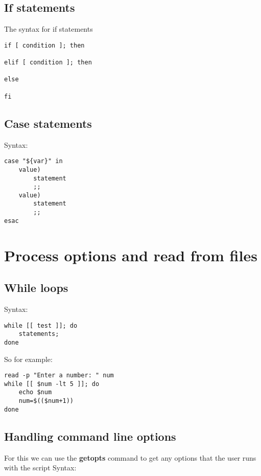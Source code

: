\documentclass{report}
\begin{document}
    \bigbreak \noindent 
    \subsection{If statements}
    The syntax for if statements
    \bigbreak \noindent 
    
    \begin{verbatim}
if [ condition ]; then 

elif [ condition ]; then

else 

fi
    \end{verbatim}
    \bigbreak \noindent
    

    \pagebreak \bigbreak \noindent 
    \subsection{Case statements}
    \bigbreak \noindent 
    Syntax:
    
    \begin{verbatim}
case "${var}" in 
    value)
        statement
        ;;
    value)
        statement
        ;;
esac
    \end{verbatim}
    \bigbreak \noindent
    
    \bigbreak \noindent 

    \pagebreak \bigbreak \noindent 
    \section{\LARGE Process options and read from files}
    \bigbreak \noindent 
    \subsection{While loops}
    \bigbreak \noindent 
    Syntax:
    
    \begin{verbatim}
while [[ test ]]; do
    statements;
done
    \end{verbatim}
    \bigbreak \noindent
    
    \bigbreak \noindent 
    So for example:
    
    \begin{verbatim}
read -p "Enter a number: " num
while [[ $num -lt 5 ]]; do
    echo $num
    num=$(($num+1))
done
    \end{verbatim}
    \bigbreak \noindent
    


    \bigbreak \noindent 
    \subsection{Handling command line options}
    \bigbreak \noindent 
    For this we can use the \textbf{getopts} command to get any options that the user runs with the script
    \bigbreak \noindent 
    Syntax:
    
\end{document}
